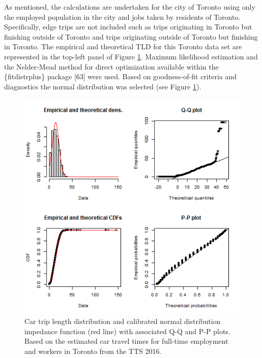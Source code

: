 \documentclass[10pt,letterpaper]{article}
\begin{document}
As mentioned, the calculations are undertaken for the city of Toronto
using only the employed population in the city and jobs taken by
residents of Toronto. Specifically, edge trips are not included such as
trips originating in Toronto but finishing outside of Toronto and trips
originating outside of Toronto but finishing in Toronto. The empirical
and theoretical TLD for this Toronto data set are represented in the
top-left panel of Figure \ref{fig:TLD-norm-plot}. Maximum likelihood
estimation and the Nelder-Mead method for direct optimization available
within the \{fitdistrplus\} package {[}63{]} were used. Based on
goodness-of-fit criteria and diagnostics the normal distribution was
selected (see Figure \ref{fig:TLD-norm-plot}).

\begin{figure}

{\centering \includegraphics[width=1\linewidth]{images/impedance_function} 

}

\caption{\label{fig:TLD-norm-plot}Car trip length distribution and calibrated normal distribution impedance function (red line) with associated Q-Q and P-P plots. Based on the estimated car travel times for full-time employment and workers in Toronto from the TTS 2016.}\label{fig:TLD-norm-plot}
\end{figure}
\end{document}
